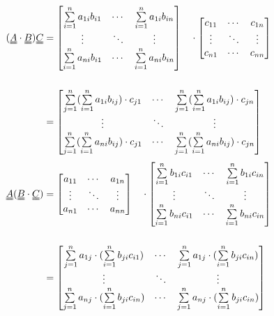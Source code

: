 \documentclass{article}
\begin{document}
\begin{equation}\notag
\begin{aligned}
( \uuline{A}\cdot\uuline{B} ) \uuline{C} &= 
\begin{bmatrix} 
\sum\limits_{i=1}^{n} a_{1i}b_{i1}&\cdots& \sum\limits_{i=1}^{n} a_{1i}b_{in}\\
\vdots&\ddots&\vdots\\
\sum\limits_{i=1}^{n} a_{ni}b_{i1}&\cdots& \sum\limits_{i=1}^{n} a_{ni}b_{in}
\end{bmatrix} 
\quad
\cdot
\begin{bmatrix}
c_{11}&\cdots&c_{1n}\\
\vdots&\ddots&\vdots\\
c_{n1}&\cdots&c_{nn}
\end{bmatrix} 
\quad
\\[15pt]
&= 
\begin{bmatrix} 
\sum\limits_{j=1}^{n}(\sum\limits_{i=1}^{n} a_{1i}b_{ij})\cdot c_{j1}&\cdots& \sum\limits_{j=1}^{n} (\sum\limits_{i=1}^{n} a_{1i}b_{ij})\cdot c_{jn}\\
\vdots&\ddots&\vdots\\
\sum\limits_{j=1}^{n}(\sum\limits_{i=1}^{n} a_{ni}b_{ij})\cdot c_{j1}&\cdots& \sum\limits_{j=1}^{n}(\sum\limits_{i=1}^{n} a_{ni}b_{ij})\cdot c_{jn}
\end{bmatrix} 
\quad
\end{aligned}
\end{equation}
\begin{equation}\notag
\begin{aligned}
\uuline{A}( \uuline{B}\cdot\uuline{C} ) &= 
\begin{bmatrix}
a_{11}&\cdots&a_{1n}\\
\vdots&\ddots&\vdots\\
a_{n1}&\cdots&a_{nn}
\end{bmatrix} 
\quad
\cdot
\begin{bmatrix} 
\sum\limits_{i=1}^{n} b_{1i}c_{i1}&\cdots& \sum\limits_{i=1}^{n} b_{1i}c_{in}\\
\vdots&\ddots&\vdots\\
\sum\limits_{i=1}^{n} b_{ni}c_{i1}&\cdots& \sum\limits_{i=1}^{n} b_{ni}c_{in}
\end{bmatrix} 
\quad
\\[15pt]
&= 
\begin{bmatrix} 
\sum\limits_{j=1}^{n}a_{1j}\cdot(\sum\limits_{i=1}^{n} b_{ji}c_{i1})&\cdots& \sum\limits_{j=1}^{n}a_{1j}\cdot(\sum\limits_{i=1}^{n} b_{ji}c_{in})\\
\vdots&\ddots&\vdots\\
\sum\limits_{j=1}^{n}a_{nj}\cdot(\sum\limits_{i=1}^{n} b_{ji}c_{in})&\cdots& \sum\limits_{j=1}^{n}a_{nj}\cdot(\sum\limits_{i=1}^{n} b_{ji}c_{in})
\end{bmatrix} 
\quad
\end{aligned}
\end{equation}
\end{document}
